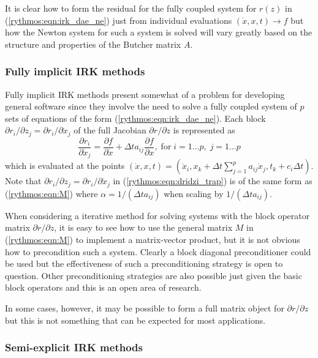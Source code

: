 \documentclass[pdf,ps2pdf,11pt]{SANDreport}
\begin{document}
It is clear how to form the residual for the fully coupled system for $r(z)$ in
(\ref{rythmos:eqn:irk_dae_ne}) just from individual evaluations $(\dot{x},x,t)
{}\rightarrow f$ but how the Newton system for such a system is solved will
vary greatly based on the structure and properties of the Butcher matrix $A$.

\subsubsection*{Fully implicit IRK methods}

Fully implicit IRK methods present somewhat of a problem for developing
general software since they involve the need to solve a fully coupled system
of $p$ sets of equations of the form (\ref{rythmos:eqn:irk_dae_ne}).  Each
block ${}\partial r_i / {}\partial z_j = {}\partial r_i / {}\partial
{}\dot{x}_j$ of the full Jacobian ${}\partial r / {}\partial z$ is represented
as
%
\begin{equation}
\frac{\partial r_i}{\partial \dot{x}_j}
= \frac{\partial f}{\partial \dot{x}}
+ \Delta t a_{ij} \frac{\partial f}{\partial x},
\; \mbox{for} \; i = 1 \ldots p, \; j = 1 \ldots p
\label{rythmos:eqn:dridzi_trap}
\end{equation}
%
which is evaluated at the points $(\dot{x},x,t) = ( {}\dot{x}_i, x_k +
{}\Delta t {}\sum_{j=1}^{p} a_{ij} {}\dot{x}_j, t_k + c_i {}\Delta t )$.  Note
that ${}\partial r_i / {}\partial z_j = {}\partial r_i / {}\partial
{}\dot{x}_j$ in (\ref{rythmos:eqn:dridzi_trap}) is of the same form as
(\ref{rythmos:eqn:M}) where $\alpha = 1 / (\Delta t a_{ij})$ when scaling by
$1 / (\Delta t a_{ij})$.

When considering a iterative method for solving systems with the block
operator matrix ${}\partial r / {}\partial z$, it is easy to see how to use
the general matrix $M$ in (\ref{rythmos:eqn:M}) to implement a matrix-vector
product, but it is not obvious how to precondition such a system.  Clearly a
block diagonal preconditioner could be used but the effectiveness of such a
preconditioning strategy is open to question.  Other preconditioning strategies
are also possible just given the basic block operators and this is an open
area of research.

In some cases, however, it may be possible to form a full matrix object for
${}\partial r / {}\partial z$ but this is not something that can be expected
for most applications.

\subsubsection*{Semi-explicit IRK methods}
\end{document}
